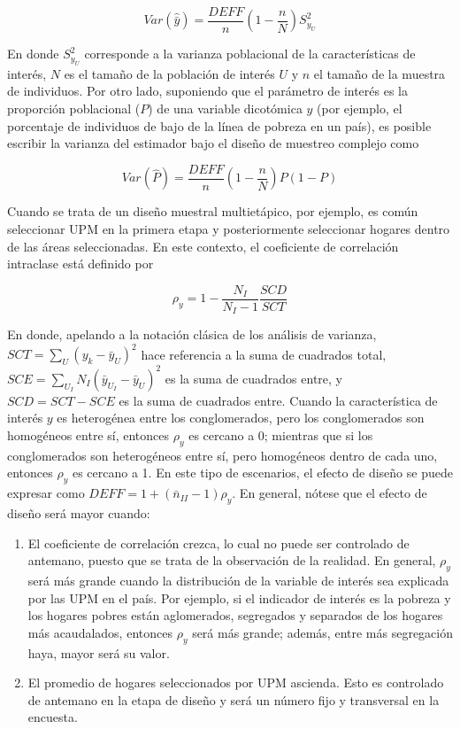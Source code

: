 \documentclass[
  12pt,
  spanish,
]{book}
\providecommand{\tightlist}{%
  \setlength{\itemsep}{0pt}\setlength{\parskip}{0pt}}
\begin{document}
\[
Var(\hat{\bar{y}}) = \frac{DEFF}{n}\left(1-\frac{n}{N}\right)S^2_{y_U}
\]

En donde \(S^2_{y_U}\) corresponde a la varianza poblacional de la características de interés, \(N\) es el tamaño de la población de interés \(U\) y \(n\) el tamaño de la muestra de individuos. Por otro lado, suponiendo que el parámetro de interés es la proporción poblacional (\(P\)) de una variable dicotómica \(y\) (por ejemplo, el porcentaje de individuos de bajo de la línea de pobreza en un país), es posible escribir la varianza del estimador bajo el diseño de muestreo complejo como

\[
Var(\hat P) = \frac{DEFF}{n}\left(1-\frac{n}{N}\right)P(1-P)
\]

Cuando se trata de un diseño muestral multietápico, por ejemplo, es común seleccionar UPM en la primera etapa y posteriormente seleccionar hogares dentro de las áreas seleccionadas. En este contexto, el coeficiente de correlación intraclase está definido por

\[
\rho_y=1-\frac{N_I}{N_I-1}\frac{SCD}{SCT}
\]

En donde, apelando a la notación clásica de los análisis de varianza, \(SCT=\sum_{U}{(y_k-{\bar{y}}_U)}^2\) hace referencia a la suma de cuadrados total, \(SCE=\sum_{U_I} N_I{({\bar{y}}_{U_I}-{\bar{y}}_U)}^2\) es la suma de cuadrados entre, y \(SCD=SCT-SCE\) es la suma de cuadrados entre. Cuando la característica de interés \(y\) es heterogénea entre los conglomerados, pero los conglomerados son homogéneos entre sí, entonces \(\rho_y\) es cercano a 0; mientras que si los conglomerados son heterogéneos entre sí, pero homogéneos dentro de cada uno, entonces \(\rho_y\) es cercano a 1. En este tipo de escenarios, el efecto de diseño se puede expresar como \(DEFF = 1 + (\bar{n}_{II}-1)\rho_y\). En general, nótese que el efecto de diseño será mayor cuando:

\begin{enumerate}
\def\labelenumi{\arabic{enumi}.}
\tightlist
\item
  El coeficiente de correlación crezca, lo cual no puede ser controlado de antemano, puesto que se trata de la observación de la realidad. En general, \(\rho_y\) será más grande cuando la distribución de la variable de interés sea explicada por las UPM en el país. Por ejemplo, si el indicador de interés es la pobreza y los hogares pobres están aglomerados, segregados y separados de los hogares más acaudalados, entonces \(\rho_y\) será más grande; además, entre más segregación haya, mayor será su valor.
\item
  El promedio de hogares seleccionados por UPM ascienda. Esto es controlado de antemano en la etapa de diseño y será un número fijo y transversal en la encuesta.
\end{enumerate}
\end{document}
